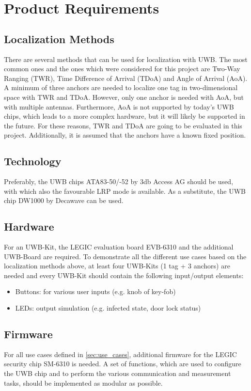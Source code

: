 \newpage
\section{Product Requirements}
\subsection{Localization Methods}
There are several methods that can be used for localization with UWB. %
The most common ones and the ones which were considered for this project are Two-Way Ranging (TWR), Time Difference of Arrival (TDoA) and Angle of Arrival (AoA). A minimum of three anchors are needed to localize one tag in two-dimensional space with TWR and TDoA. However, only one anchor is needed with AoA, but with multiple antennas. Furthermore, AoA is not supported by today's UWB chips, which leads to a more complex hardware, but it will likely be supported in the future. For these reasons, TWR and TDoA are going to be evaluated in this project. Additionally, it is assumed that the anchors have a known fixed position. %

\subsection{Technology}
Preferably, the UWB chips ATA83-50/-52 by 3db Access AG should be used, with which also the favourable LRP mode is available. As a substitute, the UWB chip DW1000 by Decawave can be used.

\subsection{Hardware}
For an UWB-Kit, the LEGIC evaluation board EVB-6310 and the additional UWB-Board are required. To demonstrate all the different use cases based on the localization methods above, at least four UWB-Kits (1 tag + 3 anchors) are needed and every UWB-Kit should contain the following input/output elements:
\begin{itemize}
		\item Buttons: for various user inputs (e.g. knob of key-fob)
		\item LEDs: output simulation (e.g. infected state, door lock status)
\end{itemize}


\subsection{Firmware}
For all use cases defined in \cref{sec:use_cases}, additional firmware for the LEGIC security chip SM-6310 is needed. A set of functions, which are used to configure the UWB chip and to perform the various communication and measurement tasks, should be implemented as modular as possible.